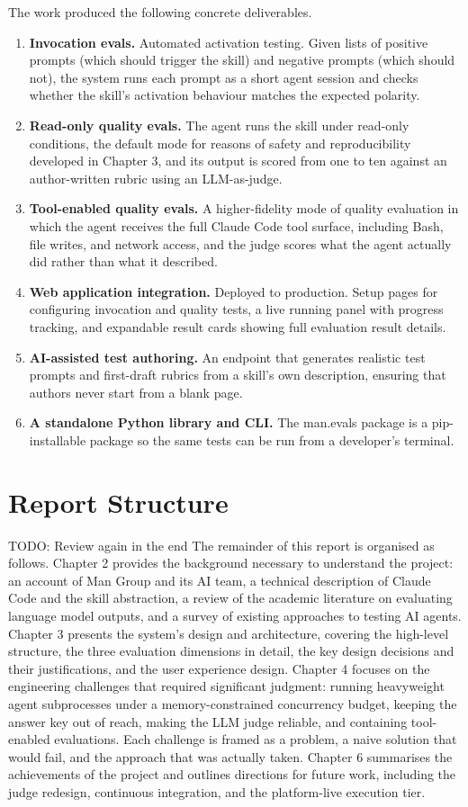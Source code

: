 The work produced the following concrete deliverables.
\begin{enumerate}
    \item \textbf{Invocation evals.} Automated activation testing. Given lists of positive prompts (which should trigger the skill) and negative prompts (which should not), the system runs each prompt as a short agent session and checks whether the skill's activation behaviour matches the expected polarity.
    \item \textbf{Read-only quality evals.} The agent runs the skill under read-only conditions, the default mode for reasons of safety and reproducibility developed in Chapter 3, and its output is scored from one to ten against an author-written rubric using an LLM-as-judge.
    \item \textbf{Tool-enabled quality evals.} A higher-fidelity mode of quality evaluation in which the agent receives the full Claude Code tool surface, including Bash, file writes, and network access, and the judge scores what the agent actually did rather than what it described.
    \item \textbf{Web application integration.} Deployed to production. Setup pages for configuring invocation and quality tests, a live running panel with progress tracking, and expandable result cards showing full evaluation result details.
    \item \textbf{AI-assisted test authoring.} An endpoint that generates realistic test prompts and first-draft rubrics from a skill's own description, ensuring that authors never start from a blank page.
    \item \textbf{A standalone Python library and CLI.} The man.evals package is a pip-installable package so the same tests can be run from a developer's terminal.
\end{enumerate}

\section{Report Structure}
TODO: Review again in the end
The remainder of this report is organised as follows. Chapter 2 provides the background necessary to understand the project: an account of Man Group and its AI team, a technical description of Claude Code and the skill abstraction, a review of the academic literature on evaluating language model outputs, and a survey of existing approaches to testing AI agents. Chapter 3 presents the system's design and architecture, covering the high-level structure, the three evaluation dimensions in detail, the key design decisions and their justifications, and the user experience design. Chapter 4 focuses on the engineering challenges that required significant judgment: running heavyweight agent subprocesses under a memory-constrained concurrency budget, keeping the answer key out of reach, making the LLM judge reliable, and containing tool-enabled evaluations. Each challenge is framed as a problem, a naive solution that would fail, and the approach that was actually taken. Chapter 6 summarises the achievements of the project and outlines directions for future work, including the judge redesign, continuous integration, and the platform-live execution tier.
